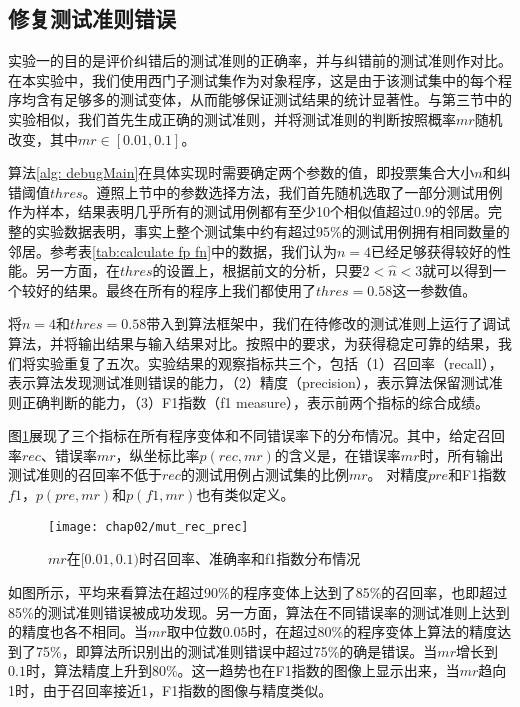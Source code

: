 \subsection{修复测试准则错误}
\label{subsection: repair test oracle}
实验一的目的是评价纠错后的测试准则的正确率，并与纠错前的测试准则作对比。在本实验中，我们使用西门子测试集作为对象程序，这是由于该测试集中的每个程序均含有足够多的测试变体，从而能够保证测试结果的统计显著性。与第三节中的实验相似，我们首先生成正确的测试准则，并将测试准则的判断按照概率$mr$随机改变，其中$mr \in [0.01, 0.1]$。

算法\ref{alg: debugMain}在具体实现时需要确定两个参数的值，即投票集合大小$n$和纠错阈值$thres$。遵照上节中的参数选择方法，我们首先随机选取了一部分测试用例作为样本，结果表明几乎所有的测试用例都有至少10个相似值超过0.9的邻居。完整的实验数据表明，事实上整个测试集中约有超过95\%的测试用例拥有相同数量的邻居。参考表\ref{tab:calculate fp fn}中的数据，我们认为$n=4$已经足够获得较好的性能。另一方面，在$thres$的设置上，根据前文的分析，只要$2 < \hat{n} < 3$就可以得到一个较好的结果。最终在所有的程序上我们都使用了$thres = 0.58$这一参数值。

将$n = 4$和$thres = 0.58$带入到算法框架中，我们在待修改的测试准则上运行了调试算法，并将输出结果与输入结果对比。按照\cite{Steimann:2013:TVV:2483760.2483767}中的要求，为获得稳定可靠的结果，我们将实验重复了五次。实验结果的观察指标共三个，包括（1）召回率（recall），表示算法发现测试准则错误的能力，（2）精度（precision），表示算法保留测试准则正确判断的能力，（3）F1指数（f1 measure），表示前两个指标的综合成绩。

图\ref{fig:mut_rec_prec_cropped}展现了三个指标在所有程序变体和不同错误率下的分布情况。其中，给定召回率$rec$、错误率$mr$，纵坐标比率$p(rec, mr)$的含义是，在错误率$mr$时，所有输出测试准则的召回率不低于$rec$的测试用例占测试集的比例$mr$。 对精度$pre$和F1指数$f1$，$p(pre, mr)$和$p(f1, mr)$也有类似定义。
\begin{figure}
	\centering
	\texttt{[image: chap02/mut\_rec\_prec]}
	\caption{$mr$在$[0.01,0.1)$时召回率、准确率和f1指数分布情况}
	\label{fig:mut_rec_prec_cropped}
\end{figure}
如图所示，平均来看算法在超过90\%的程序变体上达到了85\%的召回率，也即超过85\%的测试准则错误被成功发现。另一方面，算法在不同错误率的测试准则上达到的精度也各不相同。当$mr$取中位数$0.05$时，在超过80\%的程序变体上算法的精度达到了75\%，即算法所识别出的测试准则错误中超过75\%的确是错误。当$mr$增长到$0.1$时，算法精度上升到80\%。这一趋势也在F1指数的图像上显示出来，当$mr$趋向1时，由于召回率接近1，F1指数的图像与精度类似。

